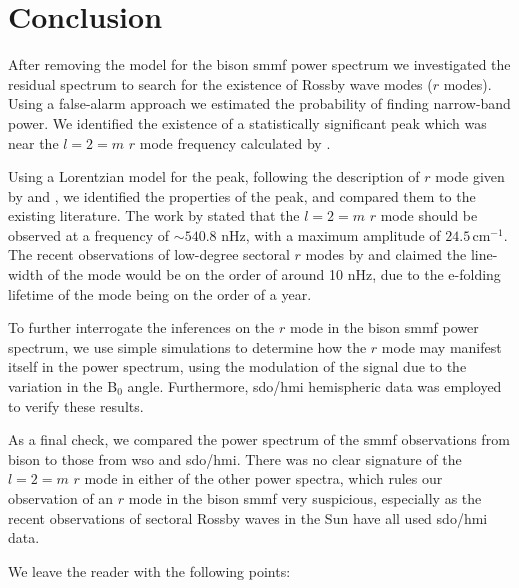 \section{Conclusion}\label{sec:r-mode_conclusion}

After removing the model for the \gls{bison} \gls{smmf} power spectrum we investigated the residual spectrum to search for the existence of Rossby wave modes ($r$ modes). Using a false-alarm approach we estimated the probability of finding narrow-band power. We identified the existence of a statistically significant peak which was near the $l=2=m$ $r$ mode frequency calculated by \citet{lanza_sectoral_2019}.

Using a Lorentzian model for the peak, following the description of $r$ mode given by \citet{loptien_global-scale_2018} and \citet{liang_time-distance_2019}, we identified the properties of the peak, and compared them to the existing literature. The work by \citet{lanza_sectoral_2019} stated that the $l=2=m$ $r$ mode should be observed at a frequency of $\sim 540.8$ nHz, with a maximum amplitude of $24.5 \, \mathrm{cm}^{-1}$. The recent observations of low-degree sectoral $r$ modes by \citet{loptien_global-scale_2018} and \citet{liang_time-distance_2019} claimed the line-width of the mode would be on the order of around 10 nHz, due to the e-folding lifetime of the mode being on the order of a year.

To further interrogate the inferences on the $r$ mode in the \gls{bison} \gls{smmf} power spectrum, we use simple simulations to determine how the $r$ mode may manifest itself in the power spectrum, using the modulation of the signal due to the variation in the B$_0$ angle. Furthermore, \gls{sdo/hmi} hemispheric data was employed to verify these results.

As a final check, we compared the power spectrum of the \gls{smmf} observations from \gls{bison} to those from \gls{wso} and \gls{sdo/hmi}. There was no clear signature of the $l=2=m$ $r$ mode in either of the other power spectra, which rules our observation of an $r$ mode in the \gls{bison} \gls{smmf} very suspicious, especially as the recent observations of sectoral Rossby waves in the Sun have all used \gls{sdo/hmi} data.

We leave the reader with the following points:

